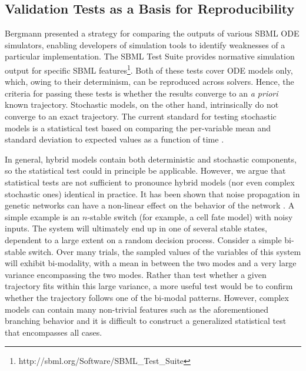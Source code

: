 \documentclass[journal,transmag,twoside]{IEEEtran}
\begin{document}
\subsection{Validation Tests as a Basis for Reproducibility}

Bergmann \cite{bergmann2008comparing} presented a strategy for comparing the outputs of various SBML ODE simulators, enabling developers of simulation tools to identify weaknesses of a particular implementation. The SBML Test Suite provides normative simulation output for specific SBML features\footnote{http://sbml.org/Software/SBML\_Test\_Suite}. Both of these tests cover ODE models only, which, owing to their determinism, can be reproduced across solvers. Hence, the criteria for passing these tests is whether the results converge to an \textit{a priori} known trajectory. Stochastic models, on the other hand, intrinsically do not converge to an exact trajectory. The current standard for testing stochastic models is a statistical test based on comparing the per-variable mean and standard deviation to expected values as a function of time \cite{evans2008sbml}.

In general, hybrid models contain both deterministic and stochastic components, so the statistical test could in principle be applicable. However, we argue that statistical tests are not sufficient to pronounce hybrid models (nor even complex stochastic ones) identical in practice. It has been shown that noise propagation in genetic networks can have a non-linear effect on the behavior of the network \cite{kim2013nonlinear}. A simple example is an $n$-stable switch (for example, a cell fate model) with noisy inputs. The system will ultimately end up in one of several stable states, dependent to a large extent on a random decision process. Consider a simple bi-stable switch. Over many trials, the sampled values of the variables of this system will exhibit bi-modality, with a mean in between the two modes and a very large variance encompassing the two modes. Rather than test whether a given trajectory fits within this large variance, a more useful test would be to confirm whether the trajectory follows one of the bi-modal patterns. However, complex models can contain many non-trivial features such as the aforementioned branching behavior and it is difficult to construct a generalized statistical test that encompasses all cases.
\end{document}
